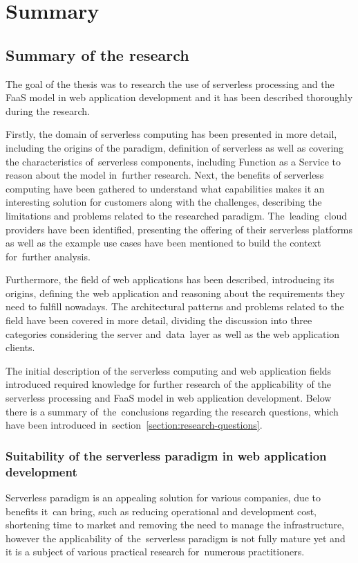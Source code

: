 \chapter{Summary}

\section{Summary of the research}

The goal of the thesis was to research the use of serverless processing and the FaaS model in web application development and it has been described thoroughly during the research.

Firstly, the domain of serverless computing has been presented in more detail, including the origins of the paradigm, definition of serverless as well as covering the characteristics of~serverless components, including Function as a Service to reason about the model in~further research.
Next, the benefits of serverless computing have been gathered to understand what capabilities makes it an interesting solution for customers along with the challenges, describing the limitations and problems related to the researched paradigm.
The~leading~cloud providers have been identified, presenting the offering of their serverless platforms as well as the example use cases have been mentioned to build the context for~further analysis.

Furthermore, the field of web applications has been described, introducing its origins, defining the web application and reasoning about the requirements they need to fulfill nowadays.
The architectural patterns and problems related to the field have been covered in more detail, dividing the discussion into three categories considering the server and~data~layer as well as the web application clients.

The initial description of the serverless computing and web application fields introduced required knowledge for further research of the applicability of the serverless processing and FaaS model in web application development.
Below there is a summary of~the~conclusions regarding the research questions, which have been introduced in~section~\ref{section:research-questions}.

\subsection{Suitability of the serverless paradigm in web application development}

Serverless paradigm is an appealing solution for various companies, due to benefits it~can bring, such as reducing operational and development cost, shortening time to market and removing the need to manage the infrastructure, however the applicability of~the~serverless paradigm is not fully mature yet and it is a subject of various practical research for~numerous practitioners.

